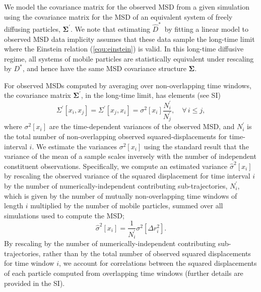 \documentclass[reprint,superscriptaddress,nobibnotes,amsmath,amssymb,aps,prx,hidelinks]{revtex4-2}
\newcommand{\oMSDi}{\ensuremath{x_i}}
\newcommand{\oMSDj}{\ensuremath{x_j}}
\newcommand{\nind}[1]{\ensuremath{N^\prime_{#1}}}
\newcommand{\Dest}{\ensuremath{\widehat{D}^*}}
\newcommand{\D}{\ensuremath{D^*}}
\newcommand{\var}[1]{\ensuremath{\sigma^2[#1]}}
\newcommand{\varest}[1]{\ensuremath{\widehat{\sigma}^2[#1]}}
\begin{document}
We model the covariance matrix for the observed MSD from a given simulation using the covariance matrix for the MSD of an equivalent system of freely diffusing particles, $\mathbf{\Sigma^\prime}$.
We note that estimating \Dest\ by fitting a linear model to observed MSD data implicity assumes that these data sample the long-time limit where the Einstein relation (\cref{equ:einstein}) is valid.
In this long-time diffusive regime, all systems of mobile particles are statistically equivalent under rescaling by \D, and hence have the same MSD covariance structure $\mathbf{\Sigma}$. 

For observed MSDs computed by averaging over non-overlapping time windows, the covariance matrix $\mathbf{\Sigma^\prime}$, in the long-time limit, has elements (see SI)
\begin{equation}
  \Sigma^\prime\left[\oMSDi, \oMSDj\right]= \Sigma^\prime\left[\oMSDj, \oMSDi\right] =
  \var{\oMSDi} \frac{\nind{i}}{\nind{j}},\hspace{1em} \forall\,i \leq j,
  \label{equ:cvv}
\end{equation} 
where $\var{\oMSDi}$ are the time-dependent variances of the observed MSD, and $\nind{i}$ is the total number of non-overlapping observed squared-displacements for time-interval $i$.
We estimate the variances $\var{\oMSDi}$ using the standard result that the variance of the mean of a sample scales inversely with the number of independent constituent observations.
Specifically, we compute an estimated variance $\varest{\oMSDi}$ by rescaling the observed variance of the squared displacement for time interval $i$ by the number of numerically-independent contributing sub-trajectories, $\nind{i}$, which is given by the number of mutually non-overlapping time windows of length $i$ multiplied by the number of mobile particles, summed over all simulations used to compute the MSD;
\begin{equation}
  \varest{\oMSDi} = \frac{1}{\nind{i}}\var{\Delta r_i^2}.
  \label{equ:varestMSD}
\end{equation}
By rescaling by the number of numerically-independent contributing sub-trajectories, rather than by the total number of observed squared displacements for time window $i$, we account for correlations between the squared displacements of each particle computed from overlapping time windows (further details are provided in the SI).
\end{document}
